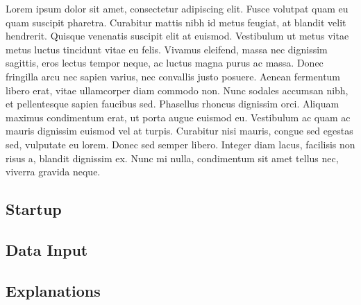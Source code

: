 Lorem ipsum dolor sit amet, consectetur adipiscing elit. Fusce volutpat quam eu quam suscipit pharetra. Curabitur mattis nibh id metus feugiat, at blandit velit hendrerit. Quisque venenatis suscipit elit at euismod. Vestibulum ut metus vitae metus luctus tincidunt vitae eu felis. Vivamus eleifend, massa nec dignissim sagittis, eros lectus tempor neque, ac luctus magna purus ac massa. Donec fringilla arcu nec sapien varius, nec convallis justo posuere. Aenean fermentum libero erat, vitae ullamcorper diam commodo non. Nunc sodales accumsan nibh, et pellentesque sapien faucibus sed. Phasellus rhoncus dignissim orci. Aliquam maximus condimentum erat, ut porta augue euismod eu. Vestibulum ac quam ac mauris dignissim euismod vel at turpis. Curabitur nisi mauris, congue sed egestas sed, vulputate eu lorem. Donec sed semper libero. Integer diam lacus, facilisis non risus a, blandit dignissim ex. Nunc mi nulla, condimentum sit amet tellus nec, viverra gravida neque.

\subsection{Startup}

\subsection{Data Input}

\subsection{Explanations}